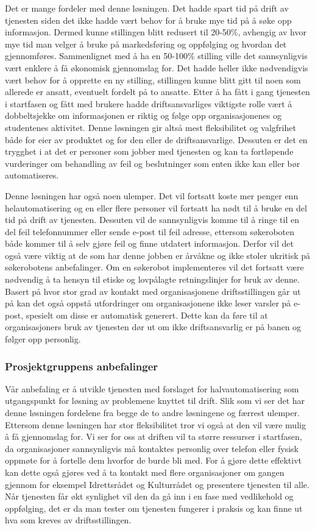 Det er mange fordeler med denne løsningen. Det hadde spart tid på drift av tjenesten siden det ikke hadde vært behov for å bruke mye tid på å søke opp informasjon. Dermed kunne stillingen blitt redusert til 20-50\%, avhengig av hvor mye tid man velger å bruke på markedsføring og oppfølging og hvordan det gjennomføres. Sammenlignet med å ha en 50-100\% stilling ville det sannsynligvis vært enklere å få økonomisk gjennomslag for. Det hadde heller ikke nødvendigvis vært behov for å opprette en ny stilling, stillingen kunne blitt gitt til noen som allerede er ansatt, eventuelt fordelt på to ansatte. Etter å ha fått i gang tjenesten i startfasen og fått med brukere hadde driftsansvarliges viktigste rolle vært å dobbeltsjekke om informasjonen er riktig og følge opp organisasjonenes og studentenes aktivitet. Denne løsningen gir altså mest fleksibilitet og valgfrihet både for eier av produktet og for den eller de driftsansvarlige. Dessuten er det en trygghet i at det er personer som jobber med tjenesten og kan ta fortløpende vurderinger om behandling av feil og beslutninger som enten ikke kan eller bør automatiseres.

Denne løsningen har også noen ulemper. Det vil fortsatt koste mer penger enn helautomatisering og en eller flere personer vil fortsatt ha nødt til å bruke en del tid på drift av tjenesten. Dessuten vil de sannsynligvis komme til å ringe til en del feil telefonnummer eller sende e-post til feil adresse, ettersom søkeroboten både kommer til å selv gjøre feil og finne utdatert informasjon. Derfor vil det også være viktig at de som har denne jobben er årvåkne og ikke stoler ukritisk på søkerobotens anbefalinger. Om en søkerobot implementeres vil det fortsatt være nødvendig å ta hensyn til etiske og lovpålagte retningslinjer for bruk av denne. Basert på hvor stor grad av kontakt med organisasjonene driftsstillingen går ut på kan det også oppstå utfordringer om organisasjonene ikke leser varsler på e-post, spesielt om disse er automatisk generert. Dette kan da føre til at organisasjoners bruk av tjenesten dør ut om ikke driftsansvarlig er på banen og følger opp personlig. 

\subsubsection{Prosjektgruppens anbefalinger}
Vår anbefaling er å utvikle tjenesten med forslaget for halvautomatisering som utgangspunkt for løsning av problemene knyttet til drift. Slik som vi ser det har denne løsningen fordelene fra begge de to andre løsningene og færrest ulemper. Ettersom denne løsningen har stor fleksibilitet tror vi også at den vil være mulig å få gjennomslag for. Vi ser for oss at driften vil ta større ressurser i startfasen, da organisasjoner sannsynligvis må kontaktes personlig over telefon eller fysisk oppmøte for å fortelle dem hvorfor de burde bli med. For å gjøre dette effektivt kan dette også gjøres ved å ta kontakt med flere organisasjoner om gangen gjennom for eksempel Idrettsrådet og Kulturrådet og presentere tjenesten til alle. Når tjenesten får økt synlighet vil den da gå inn i en fase med vedlikehold og oppfølging, det er da man tester om tjenesten fungerer i praksis og kan finne ut hva som kreves av driftsstillingen. 

